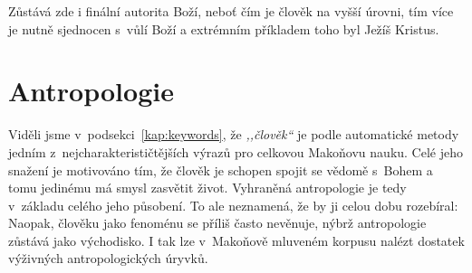 Zůstává zde i finální autorita Boží, neboť čím je člověk na vyšší úrovni, tím
více je nutně sjednocen s~vůlí Boží a extrémním příkladem toho byl Ježíš
Kristus.





\section{Antropologie}

Viděli jsme v~podsekci~\ref{kap:keywords}, že \textit{,,člověk``} je podle
automatické metody jedním z~nejcharakterističtějších výrazů pro celkovou
Makoňovu nauku. Celé jeho snažení je motivováno tím, že člověk je schopen spojit
se vědomě s~Bohem a tomu jedinému má smysl zasvětit život. Vyhraněná
antropologie je tedy v~základu celého jeho působení. To ale neznamená, že by ji
celou dobu rozebíral: Naopak, člověku jako fenoménu se příliš často nevěnuje,
nýbrž antropologie zůstává jako východisko. I tak lze v~Makoňově mluveném
korpusu nalézt dostatek výživných antropologických úryvků.

